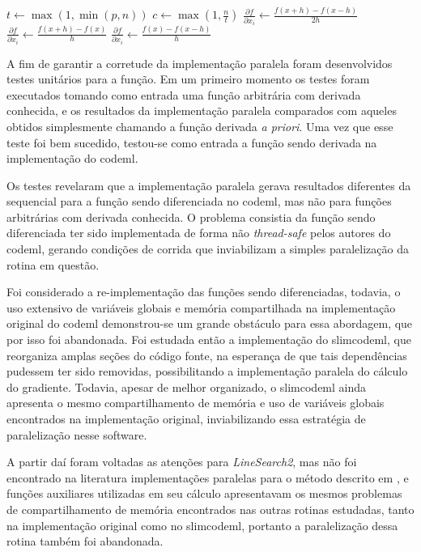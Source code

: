 \documentclass[cic,tc]{iiufrgs}
\begin{document}
\begin{algorithmic}
\State $t \gets \max(1, \min(p, n))$
\State $c \gets \max(1, \frac{n}{t})$
    \State $\frac{\partial f}{\partial x_i} \gets \frac{f(x+h)-f(x-h)}{2h}$
    \State $\frac{\partial f}{\partial x_i} \gets \frac{f(x+h)-f(x)}{h}$
  \Else
    \State $\frac{\partial f}{\partial x_i} \gets \frac{f(x)-f(x-h)}{h}$
  \EndIf
\EndFor
\end{algorithmic}

A fim de garantir a corretude da implementação paralela foram desenvolvidos
testes unitários para a função. Em um primeiro momento os testes foram
executados tomando como entrada uma função arbitrária com derivada conhecida,
e os resultados da implementação paralela comparados com aqueles obtidos
simplesmente chamando a função derivada \textit{a priori}. Uma vez que esse
teste foi bem sucedido, testou-se como entrada a função sendo derivada na
implementação do codeml.

Os testes revelaram que a implementação paralela gerava resultados diferentes
da sequencial para a função sendo diferenciada no codeml, mas não para funções
arbitrárias com derivada conhecida. O problema consistia da função sendo
diferenciada ter sido implementada de forma não \textit{thread-safe} pelos
autores do codeml, gerando condições de corrida que inviabilizam a simples
paralelização da rotina em questão.

Foi considerado a re-implementação das funções sendo diferenciadas, todavia, o
uso extensivo de variáveis globais e memória compartilhada na implementação
original do codeml demonstrou-se um grande obstáculo para essa abordagem, que
por isso foi abandonada. Foi estudada então a implementação do slimcodeml, que
reorganiza amplas seções do código fonte, na esperança de que tais
dependências pudessem ter sido removidas, possibilitando a implementação
paralela do cálculo do gradiente. Todavia, apesar de melhor organizado, o
slimcodeml ainda apresenta o mesmo compartilhamento de memória e uso de
variáveis globais encontrados na implementação original, inviabilizando essa
estratégia de paralelização nesse software.

A partir daí foram voltadas as atenções para \textit{LineSearch2}, mas não foi
encontrado na literatura implementações paralelas para o método descrito em
\cite{wolfe1978numerical}, e funções auxiliares utilizadas em seu cálculo
apresentavam os mesmos problemas de compartilhamento de memória encontrados nas
outras rotinas estudadas, tanto na implementação original como no slimcodeml,
portanto a paralelização dessa rotina também foi abandonada.
\end{document}
